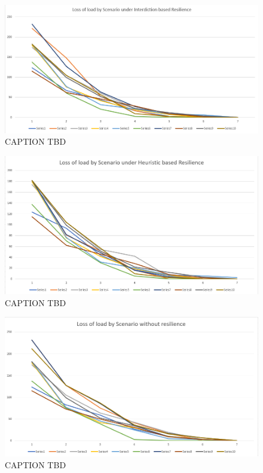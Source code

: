 \documentclass{article}
\begin{document}
\begin{figure}[htbp]
	\centering
	\includegraphics[width=.9\linewidth]{OptimalResilienceSpaghetti.png}
	\caption{CAPTION TBD}
\end{figure}
	\begin{figure}[htbp]
		\centering
		\includegraphics[width=.9\linewidth]{HeuristicResilienceSpaghetti.png}
		\caption{CAPTION TBD}
	\end{figure}
\begin{figure}[htbp]
	\centering
	\includegraphics[width=.9\linewidth]{NoResilienceSpaghetti.png}
	\caption{CAPTION TBD}
\end{figure}
\end{document}
